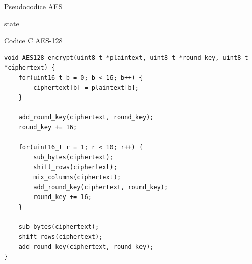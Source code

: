 \documentclass[target=bach,aauheader=,style=]{thud}
\begin{document}
			\begin{algorithm}
				\caption{Pseudocodice AES}
				\begin{algorithmic}
						\EndFor
						\Return state
					\EndProcedure
				\end{algorithmic}
			\end{algorithm}
			
			\begin{algorithm}
				\caption{Codice C AES-128}
				\begin{lstlisting}[style=CStyle]
void AES128_encrypt(uint8_t *plaintext, uint8_t *round_key, uint8_t *ciphertext) {
	for(uint16_t b = 0; b < 16; b++) {
		ciphertext[b] = plaintext[b];
	}
	
	add_round_key(ciphertext, round_key);
	round_key += 16;
	
	for(uint16_t r = 1; r < 10; r++) {
		sub_bytes(ciphertext);
		shift_rows(ciphertext);
		mix_columns(ciphertext);
		add_round_key(ciphertext, round_key);
		round_key += 16;
	}
	
	sub_bytes(ciphertext);
	shift_rows(ciphertext);
	add_round_key(ciphertext, round_key);
}\end{lstlisting}
			\end{algorithm}
			
\end{document}

